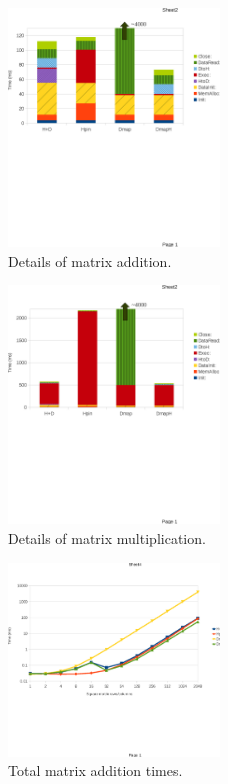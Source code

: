 \begin{figure}[t]
\centering
\includegraphics[width=0.5\textwidth, trim=0.0in 3.25in 0.0in 0.25in,
 clip=true]{eps/madd_time_spent.eps}
\caption{Details of matrix addition.}
\label{fig:madd_time_spent}
\end{figure}
\begin{figure}[t]
\centering
\includegraphics[width=0.5\textwidth, trim=0.0in 3.0in 0.0in 0.5in,
 clip=true]{eps/mmul_time_spent.eps}
\caption{Details of matrix multiplication.}
\label{fig:mmul_time_spent}
\end{figure}
\begin{figure}[t]
\centering
\includegraphics[width=0.5\textwidth, trim=0.0in 2.0in -0.3in 0.74in,
 clip=true]{eps/madd_time.eps}
\caption{Total matrix addition times.}
\label{fig:madd_time}
\end{figure}
